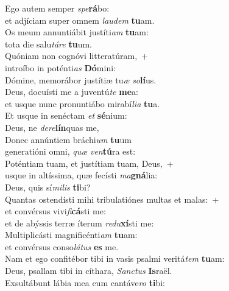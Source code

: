 \evenverse Ego autem semper \textit{spe}\textbf{rá}bo:~\*\\
\evenverse et adjíciam super omnem \textit{lau}\textit{dem} \textbf{tu}am.\\
\oddverse Os meum annuntiábit justíti\textit{am} \textbf{tu}am:~\*\\
\oddverse tota die salu\textit{tá}\textit{re} \textbf{tu}um.\\
\evenverse Quóniam non cognóvi litteratúram,~+\\
\evenverse  introíbo in poténti\textit{as} \textbf{Dó}mini:~\*\\
\evenverse Dómine, memorábor justítiæ tu\textit{æ} \textit{so}\textbf{lí}us.\\
\oddverse Deus, docuísti me a juventú\textit{te} \textbf{me}a:~\*\\
\oddverse et usque nunc pronuntiábo mirabí\textit{li}\textit{a} \textbf{tu}a.\\
\evenverse Et usque in senéctam \textit{et} \textbf{sé}nium:~\*\\
\evenverse Deus, ne \textit{de}\textit{re}\textbf{lín}quas me,\\
\oddverse Donec annúntiem bráchi\textit{um} \textbf{tu}um~\*\\
\oddverse generatióni omni, \textit{quæ} \textit{ven}\textbf{tú}ra est:\\
\evenverse Poténtiam tuam, et justítiam tuam, Deus,~+\\
\evenverse  usque in altíssima, quæ fecísti \textit{ma}\textbf{gná}lia:~\*\\
\evenverse Deus, quis sí\textit{mi}\textit{lis} \textbf{ti}bi?\\
\oddverse Quantas ostendísti mihi tribulatiónes multas et malas:~+\\
\oddverse  et convérsus vivi\textit{fi}\textbf{cá}sti me:~\*\\
\oddverse et de abýssis terræ íterum \textit{re}\textit{du}\textbf{xí}sti me:\\
\evenverse Multiplicásti magnificénti\textit{am} \textbf{tu}am:~\*\\
\evenverse et convérsus conso\textit{lá}\textit{tus} \textbf{es} me.\\
\oddverse Nam et ego confitébor tibi in vasis psalmi veritá\textit{tem} \textbf{tu}am:~\*\\
\oddverse Deus, psallam tibi in cíthara, \textit{San}\textit{ctus} \textbf{Is}raël.\\
\evenverse Exsultábunt lábia mea cum cantáve\textit{ro} \textbf{ti}bi:~\*\\
